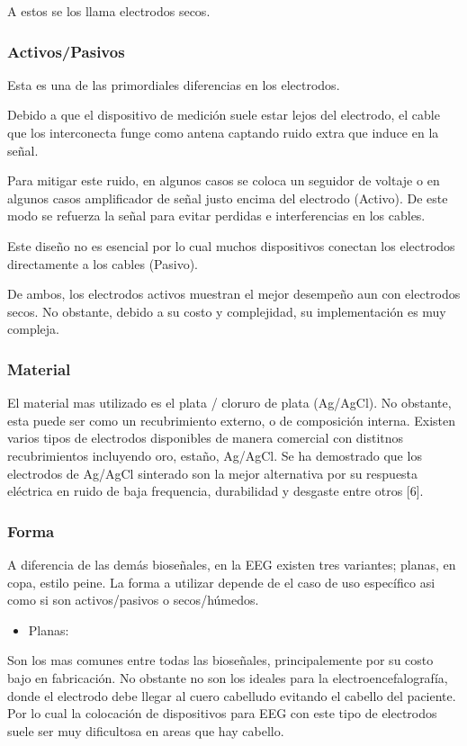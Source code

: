 A estos se los llama electrodos secos.

\subsubsection{Activos/Pasivos}
\label{sec:org5ff27fd}
Esta es una de las primordiales diferencias en los electrodos.

Debido a que el dispositivo de medición suele estar lejos del electrodo, el cable que los interconecta funge como antena captando ruido extra que induce en la señal.

Para mitigar este ruido, en algunos casos se coloca un seguidor de voltaje o en algunos casos amplificador de señal justo encima del electrodo (Activo). De este modo se refuerza la señal para evitar perdidas e interferencias en los cables.

Este diseño no es esencial por lo cual muchos dispositivos conectan los electrodos directamente a los cables (Pasivo).

De ambos, los electrodos activos muestran el mejor desempeño aun con electrodos secos. No obstante, debido a su costo y complejidad, su implementación es muy compleja.

\subsubsection{Material}
\label{sec:org2c76dfd}
El material mas utilizado es el plata / cloruro de plata (Ag/AgCl). No obstante, esta puede ser como un recubrimiento externo, o de composición interna. Existen varios tipos de electrodos disponibles de manera comercial con distitnos recubrimientos incluyendo oro, estaño, Ag/AgCl. Se ha demostrado que los electrodos de Ag/AgCl sinterado son la mejor alternativa por su respuesta eléctrica en ruido de baja frequencia, durabilidad y desgaste entre otros [6].

\subsubsection{Forma}
\label{sec:org3480c41}
A diferencia de las demás bioseñales, en la EEG existen tres variantes; planas, en copa, estilo peine. La forma a utilizar depende de el caso de uso específico asi como si son activos/pasivos o secos/húmedos.

\begin{itemize}
\item Planas:
\end{itemize}
Son los mas comunes entre todas las bioseñales, principalemente por su costo bajo en fabricación. No obstante no son los ideales para la electroencefalografía, donde el electrodo debe llegar al cuero cabelludo evitando el cabello del paciente. Por lo cual la colocación de dispositivos para EEG con este tipo de electrodos suele ser muy dificultosa en areas que hay cabello.

